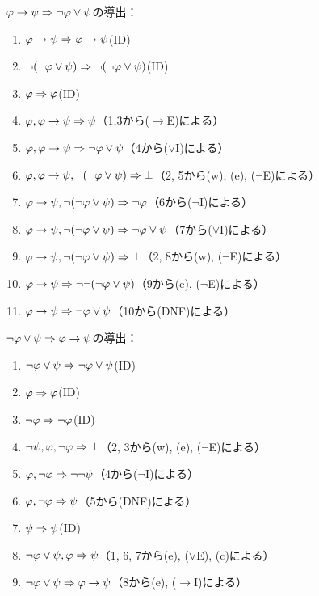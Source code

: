 \(\varphi \to \psi \Rightarrow \lnot \varphi \lor \psi\)の導出：
\begin{enumerate}
	\item \(\varphi \to \psi \Rightarrow \varphi \to \psi\)\quad (ID)
	\item \(\lnot \paren{\lnot \varphi \lor \psi} \sequent \lnot \paren{\lnot \varphi \lor \psi}\)\quad (ID)
	\item \(\varphi \Rightarrow \varphi\)\quad (ID)
	\item \(\varphi, {\varphi \to \psi} \Rightarrow \psi\)\quad （1,3から(\(\to\)E)による）
	\item \(\varphi, {\varphi \to \psi} \Rightarrow \lnot \varphi \lor \psi\)\quad （4から(\(\lor\)I)による）
	\item \(\varphi, {\varphi \to \psi}, \lnot \paren{\lnot \varphi \lor \psi} \sequent \bot\)\quad （2, 5から(w), (e), (\(\lnot\)E)による）
	\item \(\varphi \to \psi, \lnot \paren{\lnot \varphi \lor \psi} \sequent \lnot \varphi\)\quad （6から(\(\lnot\)I)による）
	\item \(\varphi \to \psi, \lnot \paren{\lnot \varphi \lor \psi} \sequent \lnot \varphi \lor \psi\)\quad （7から(\(\lor\)I)による）
	\item \(\varphi \to \psi, \lnot \paren{\lnot \varphi \lor \psi} \sequent \bot\)\quad （2, 8から(w), (\(\lnot\)E)による）
	\item \(\varphi \to \psi \sequent \lnot \lnot \paren{\lnot \varphi \lor \psi}\)\quad （9から(e), (\(\lnot\)E)による）
	\item \(\varphi \to \psi \Rightarrow \lnot \varphi \lor \psi\)\quad （10から(DNF)による）
\end{enumerate}

\(\lnot \varphi \lor \psi \Rightarrow \varphi \to \psi\)の導出：
\begin{enumerate}
	\item \(\lnot \varphi \lor \psi \Rightarrow \lnot \varphi \lor \psi\)\quad (ID)
	\item \(\varphi \Rightarrow \varphi\)\quad (ID)
	\item \(\lnot \varphi \Rightarrow \lnot \varphi\)\quad (ID)
	\item \(\lnot \psi, \varphi, \lnot \varphi \Rightarrow \bot\)\quad （2, 3から(w), (e), (\(\lnot\)E)による）
	\item \(\varphi, \lnot \varphi \Rightarrow \lnot \lnot \psi\)\quad （4から(\(\lnot\)I)による）
	\item \(\varphi, \lnot \varphi \Rightarrow \psi\)\quad （5から(DNF)による）
	\item \(\psi \Rightarrow \psi\)\quad (ID)
	\item \(\lnot \varphi \lor \psi, \varphi \Rightarrow \psi\)\quad （1, 6, 7から(e), (\(\lor\)E), (c)による）
	\item \(\lnot \varphi \lor \psi \Rightarrow \varphi \to \psi\)\quad （8から(e), (\(\to\)I)による）
\end{enumerate}

